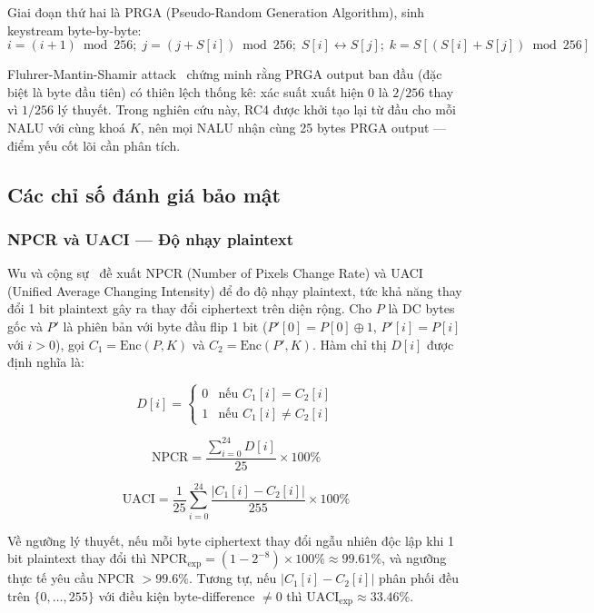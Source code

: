 Giai đoạn thứ hai là PRGA (Pseudo-Random Generation Algorithm), sinh keystream byte-by-byte:
\begin{equation}
i = (i+1)\bmod 256;\; j = (j+S[i])\bmod 256;\; S[i]\leftrightarrow S[j];\; k = S[(S[i]+S[j])\bmod 256]
\end{equation}

Fluhrer-Mantin-Shamir attack~\cite{fms_rc4} chứng minh rằng PRGA output ban đầu (đặc biệt là byte đầu tiên) có thiên lệch thống kê: xác suất xuất hiện 0 là $2/256$ thay vì $1/256$ lý thuyết. Trong nghiên cứu này, RC4 được khởi tạo lại từ đầu cho mỗi NALU với cùng khoá $K$, nên mọi NALU nhận cùng 25 bytes PRGA output --- điểm yếu cốt lõi cần phân tích.

\subsection{Các chỉ số đánh giá bảo mật}

\subsubsection{NPCR và UACI --- Độ nhạy plaintext}

Wu và cộng sự~\cite{wu_npcr} đề xuất NPCR (Number of Pixels Change Rate) và UACI (Unified Average Changing Intensity) để đo độ nhạy plaintext, tức khả năng thay đổi 1 bit plaintext gây ra thay đổi ciphertext trên diện rộng. Cho $P$ là DC bytes gốc và $P'$ là phiên bản với byte đầu flip 1 bit ($P'[0] = P[0] \oplus 1$, $P'[i] = P[i]$ với $i > 0$), gọi $C_1 = \text{Enc}(P, K)$ và $C_2 = \text{Enc}(P', K)$. Hàm chỉ thị $D[i]$ được định nghĩa là:

\begin{equation}
D[i] = \begin{cases} 0 & \text{nếu } C_1[i] = C_2[i] \\ 1 & \text{nếu } C_1[i] \neq C_2[i] \end{cases}
\end{equation}

\begin{equation}
\text{NPCR} = \frac{\sum_{i=0}^{24} D[i]}{25} \times 100\%
\label{eq:npcr}
\end{equation}

\begin{equation}
\text{UACI} = \frac{1}{25} \sum_{i=0}^{24} \frac{|C_1[i] - C_2[i]|}{255} \times 100\%
\label{eq:uaci}
\end{equation}

Về ngưỡng lý thuyết, nếu mỗi byte ciphertext thay đổi ngẫu nhiên độc lập khi 1 bit plaintext thay đổi thì $\text{NPCR}_{\text{exp}} = (1 - 2^{-8}) \times 100\% \approx 99.61\%$, và ngưỡng thực tế yêu cầu NPCR $> 99.6\%$. Tương tự, nếu $|C_1[i] - C_2[i]|$ phân phối đều trên $\{0, \ldots, 255\}$ với điều kiện byte-difference $\neq 0$ thì $\text{UACI}_{\text{exp}} \approx 33.46\%$.

